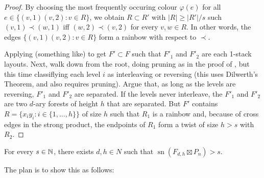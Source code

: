\documentclass[kpfonts]{patmorin}
\DeclareMathOperator{\sn}{sn}
\begin{document}
\begin{proof}
  
  
  
  
  
  
  
  
  By choosing the most frequently occuring colour $\varphi(e)$ for all $e\in\{(v,1)(v,2):v\in R\}$, we obtain $R\subset R'$ with $|R|\ge |R'|/s$ such $(v,1)\prec (w,1)$ iff $(w,2)\prec (v,2)$ for every $v,w\in R$. In other words, the edges $\{(v,1)(v,2):v\in R\}$ form a rainbow with respect to $\prec$.
  
  
  
  
  Applying (something like)  to get $F'\subset F$ such that $F'_1$ and $F'_2$ are each 1-stack layouts.  Next, walk down from the root, doing pruning as in the proof of , but this time classiflying each level $i$ as interleaving or reversing (this uses Dilwerth's Theorem, and also requires pruning).  Argue that, as long as the levels are reversing, $F'_1$ and $F'_2$ are separated.  If the levels never interleave, the $F'_1$ and $F'_2$ are two $d$-ary forests of height $h$ that are separated.  But $F'$ contains  $R=\{x_iy_i:i\in\{1,\ldots,h\}\}$ of size $h$ such that $R_1$ is a rainbow and, because of cross edges in the strong product, the endpoints of $R_1$ form a twist of size $h>s$ with $R_2$.   
\end{proof}


\begin{clm}
  For every $s\in\mathbb{N}$, there exists $d,h\in N$ such that $\sn(F_{d,h}\boxtimes P_n)> s$.
\end{clm}

The plan is to show this as follows:
\end{document}
